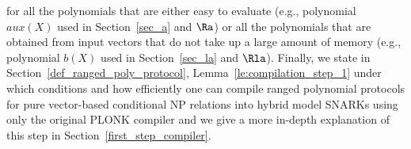 for all the polynomials that are either easy to evaluate (e.g., polynomial $aux(X)$ used in Section~\ref{sec_a} and $\Ra$) or 
all the polynomials that are obtained from input vectors that do not take up a large amount of memory (e.g., polynomial $b(X)$ used in Section~\ref{sec_la} and $\Rla$).
Finally, we state in Section~\ref{def_ranged_poly_protocol}, Lemma~\ref{le:compilation_step_1} under which conditions and how efficiently 
one can compile ranged polynomial protocols for pure vector-based conditional NP relations 
into hybrid model SNARKs using only the original PLONK compiler and we give a more in-depth explanation of this step in Section~\ref{first_step_compiler}.\\